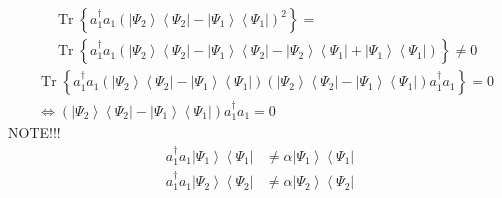 \documentclass[aps,preprint]{revtex4}%
\begin{document}
\begin{align}
& \operatorname*{Tr}\left\{  a_{1}^{\dagger}a_{1}\left(  \left\vert \Psi
_{2}\right\rangle \left\langle \Psi_{2}\right\vert -\left\vert \Psi
_{1}\right\rangle \left\langle \Psi_{1}\right\vert \right)  ^{2}\right\}  =\\
& \operatorname*{Tr}\left\{  a_{1}^{\dagger}a_{1}\left(  \left\vert \Psi
_{2}\right\rangle \left\langle \Psi_{2}\right\vert -\left\vert \Psi
_{1}\right\rangle \left\langle \Psi_{2}\right\vert -\left\vert \Psi
_{2}\right\rangle \left\langle \Psi_{1}\right\vert +\left\vert \Psi
_{1}\right\rangle \left\langle \Psi_{1}\right\vert \right)  \right\}  \neq0
\end{align}%
\begin{align}
& \operatorname*{Tr}\left\{  a_{1}^{\dagger}a_{1}\left(  \left\vert \Psi
_{2}\right\rangle \left\langle \Psi_{2}\right\vert -\left\vert \Psi
_{1}\right\rangle \left\langle \Psi_{1}\right\vert \right)  \left(  \left\vert
\Psi_{2}\right\rangle \left\langle \Psi_{2}\right\vert -\left\vert \Psi
_{1}\right\rangle \left\langle \Psi_{1}\right\vert \right)  a_{1}^{\dagger
}a_{1}\right\}  =0\\
& \Leftrightarrow\left(  \left\vert \Psi_{2}\right\rangle \left\langle
\Psi_{2}\right\vert -\left\vert \Psi_{1}\right\rangle \left\langle \Psi
_{1}\right\vert \right)  a_{1}^{\dagger}a_{1}=0
\end{align}
NOTE!!!%
\begin{align}
a_{1}^{\dagger}a_{1}\left\vert \Psi_{1}\right\rangle \left\langle \Psi
_{1}\right\vert  & \neq\alpha\left\vert \Psi_{1}\right\rangle \left\langle
\Psi_{1}\right\vert \\
a_{1}^{\dagger}a_{1}\left\vert \Psi_{2}\right\rangle \left\langle \Psi
_{2}\right\vert  & \neq\alpha\left\vert \Psi_{2}\right\rangle \left\langle
\Psi_{2}\right\vert
\end{align}
\end{document}
